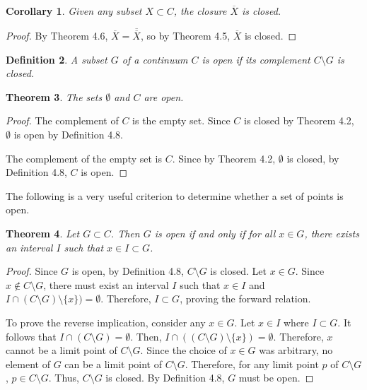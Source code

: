 \documentclass{amsart}
\newtheorem{theorem}{Theorem}
\newtheorem{definition}[theorem]{Definition}
\newtheorem{corollary}[theorem]{Corollary}
\newcommand{\1}{\mathds{1}}
\numberwithin{equation}{section}
\numberwithin{theorem}{section}
\begin{document}
\begin{corollary}  Given any subset $X \subset C$, the closure $\overline{X}$ is closed.
\end{corollary}

\begin{proof}
	By Theorem 4.6, $\overline{X} = \overline{\overline{X}}$, so by Theorem 4.5, $\overline{X}$ is closed.
\end{proof}

\begin{definition}  A subset $G$ of a continuum $C$ is \emph{open} if its complement $C \setminus G$ is closed.
\end{definition}

\begin{theorem}\label{fortop1}  The sets $\emptyset$ and $C$ are open.
\end{theorem}

\begin{proof}
	The complement of $C$ is the empty set. Since $C$ is closed by Theorem 4.2, $\emptyset$ is open by Definition 4.8.
	
	The complement of the empty set is $C$. Since by Theorem 4.2, $\emptyset$ is closed, by Definition 4.8, $C$ is open. 
\end{proof}

The following is a very useful criterion to determine whether a set of points is open.

\begin{theorem}  Let $G \subset C$.  Then $G$ is open if and only if for all $x \in G$, there exists an interval $I$ such that $x \in I \subset G$.
\end{theorem}

\begin{proof}
	Since $G$ is open, by Definition 4.8, $C\setminus G$ is closed. Let $x\in G$. Since $x\notin C\setminus G$, there must exist an interval $I$ such that $x\in I$ and $I\cap (C\setminus G)\setminus \{x\}) = \emptyset$. Therefore, $I\subset G$, proving the forward relation.
	
	To prove the reverse implication, consider any $x\in G$. Let $x\in I$ where $I\subset G$. It follows that $I\cap (C\setminus G) = \emptyset$. Then, $I\cap ((C\setminus G)\setminus \{x\})  = \emptyset$. Therefore, $x$ cannot be a limit point of $C\setminus G$. Since the choice of $x\in G$ was arbitrary, no element of $G$ can be a limit point of $C\setminus G$. Therefore, for any limit point $p$ of $C\setminus G$, $p\in C\setminus G$. Thus, $C\setminus G$ is closed. By Definition 4.8, $G$ must be open.
\end{proof}
\end{document}

